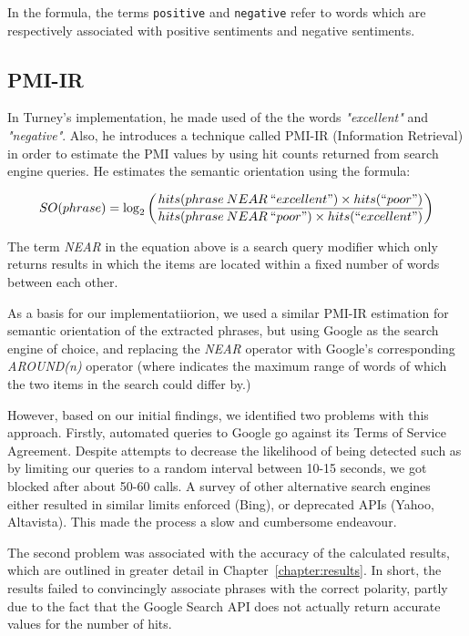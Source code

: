 \documentclass[11pt]{report} %
\begin{document}
In the formula, the terms \verb|positive| and \verb|negative| refer to words which are respectively associated with positive sentiments and negative sentiments. 

\subsection{PMI-IR}
In Turney's implementation, he made used of the the words \textit{"excellent"} and \textit{"negative"}. Also, he introduces a technique called PMI-IR (Information Retrieval) in order to estimate the PMI values by using hit counts returned from search engine queries. He estimates the semantic orientation using the formula:

\begin{equation*} SO(phrase) = \log_2 \left(\frac{hits(phrase \: NEAR \: ``excellent") \times hits(``poor") }{hits(phrase \: NEAR \: ``poor") \times hits(``excellent") }\right) \end{equation*}

The term \textit{NEAR} in the equation above is a search query modifier which only returns results in which the items are located within a fixed number of words between each other. 

As a basis for our implementatiiorion, we used a similar PMI-IR estimation for semantic orientation of the extracted phrases, but using Google as the search engine of choice, and replacing the \textit{NEAR} operator with Google's corresponding \textit{AROUND(n)} operator (where  indicates the maximum range of words of which the two items in the search could differ by.)

However, based on our initial findings, we identified two problems with this approach. Firstly, automated queries to Google go against its Terms of Service Agreement. Despite attempts to decrease the likelihood of being detected such as by limiting our queries to a random interval between 10-15 seconds, we got blocked after about 50-60 calls. A survey of other alternative search engines either resulted in similar limits enforced (Bing), or deprecated APIs (Yahoo, Altavista). This made the process a slow and cumbersome endeavour.

The second problem was associated with the accuracy of the calculated results, which are outlined in greater detail in Chapter~\ref{chapter:results}. In short, the results failed to convincingly associate phrases with the correct polarity, partly due to the fact that the Google Search API does not actually return accurate values for the number of hits.
\end{document}

